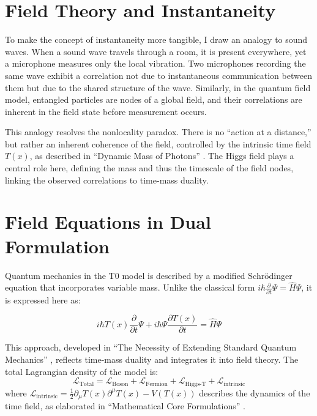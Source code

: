 \documentclass[a4paper,12pt]{article}
\newcommand{\Tfield}{T(x)}
\theoremstyle{definition}
\theoremstyle{remark}
\begin{document}
	\section{Field Theory and Instantaneity}
	
	To make the concept of instantaneity more tangible, I draw an analogy to sound waves. When a sound wave travels through a room, it is present everywhere, yet a microphone measures only the local vibration. Two microphones recording the same wave exhibit a correlation not due to instantaneous communication between them but due to the shared structure of the wave. Similarly, in the quantum field model, entangled particles are nodes of a global field, and their correlations are inherent in the field state before measurement occurs.
	
	This analogy resolves the nonlocality paradox. There is no “action at a distance,” but rather an inherent coherence of the field, controlled by the intrinsic time field \(\Tfield\), as described in “Dynamic Mass of Photons” \cite{pascher_photons_2025}. The Higgs field plays a central role here, defining the mass and thus the timescale of the field nodes, linking the observed correlations to time-mass duality.
	
	\section{Field Equations in Dual Formulation}
	
	Quantum mechanics in the T0 model is described by a modified Schrödinger equation that incorporates variable mass. Unlike the classical form \(i\hbar \frac{\partial}{\partial t} \Psi = \hat{H} \Psi\), it is expressed here as:
	
	\begin{equation}
		i\hbar \Tfield \frac{\partial}{\partial t} \Psi + i\hbar \Psi \frac{\partial \Tfield}{\partial t} = \hat{H} \Psi
	\end{equation}
	
	This approach, developed in “The Necessity of Extending Standard Quantum Mechanics” \cite{pascher_quantum_2025}, reflects time-mass duality and integrates it into field theory. The total Lagrangian density of the model is:
	\begin{equation}
		\mathcal{L}_{\text{Total}} = \mathcal{L}_{\text{Boson}} + \mathcal{L}_{\text{Fermion}} + \mathcal{L}_{\text{Higgs-T}} + \mathcal{L}_{\text{intrinsic}}
	\end{equation}
	where \(\mathcal{L}_{\text{intrinsic}} = \frac{1}{2} \partial_\mu \Tfield \partial^\mu \Tfield - V(\Tfield)\) describes the dynamics of the time field, as elaborated in “Mathematical Core Formulations” \cite{pascher_lagrange_2025}.
	
\end{document}
